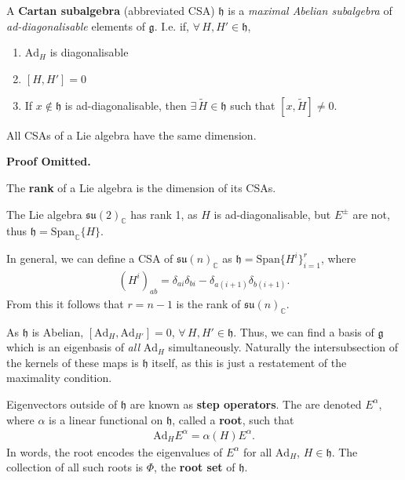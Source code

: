 \documentclass[11pt,fleqn]{article}
\renewenvironment{prop}{\begin{pBox}\begin{propT}}{\end{propT}\end{pBox}}
\begin{document}
\begin{definition}
	A \textbf{Cartan subalgebra} (abbreviated CSA) $\mathfrak{h}$ is a \textit{maximal Abelian subalgebra} of \\ \textit{ad-diagonalisable} elements of $\mathfrak{g}$. I.e. if, $\forall \, H, H' \in \mathfrak{h}$,
		\begin{enumerate}[label=(\roman*)]
			\item $\text{Ad}_H$ is diagonalisable
			\item $[H,H'] = 0$
			\item If $x \notin \mathfrak{h}$ is ad-diagonalisable, then $\exists \, \tilde{H}\in \mathfrak{h}$ such that $[x,\tilde{H}] \neq 0$.
		\end{enumerate}
\end{definition}

\begin{prop}
	All CSAs of a Lie algebra have the same dimension.
\end{prop}
\textbf{Proof Omitted.}

\begin{definition}
	The \textbf{rank} of a Lie algebra is the dimension of its CSAs.
\end{definition}

\begin{example}
	The Lie algebra $\mathfrak{su}(2)_\mathbb{C}$ has rank 1, as $H$ is ad-diagonalisable, but $E^\pm$ are not, thus $\mathfrak{h} = \text{Span}_\mathbb{C}\{H\}$.

	In general, we can define a CSA of $\mathfrak{su}(n)_\mathbb{C}$ as $\mathfrak{h} = \text{Span}\{H^i\}_{i=1}^r$, where
		\begin{align}
			(H^i)_{ab} = \delta_{ai}\delta_{bi} - \delta_{a(i+1)}\delta_{b(i+1)}.
		\end{align}
	From this it follows that $r = n-1$ is the rank of $\mathfrak{su}(n)_\mathbb{C}$.
\end{example}

\begin{remark}
	As $\mathfrak{h}$ is Abelian, $[\text{Ad}_H, \text{Ad}_{H'}] = 0$, $\forall \, H,H' \in \mathfrak{h}$. Thus, we can find a basis of $\mathfrak{g}$ which is an eigenbasis of \textit{all} $\text{Ad}_H$ simultaneously. Naturally the intersubsection of the kernels of these maps is $\mathfrak{h}$ itself, as this is just a restatement of the maximality condition.
\end{remark}

\begin{definition}
	Eigenvectors outside of $\mathfrak{h}$ are known as \textbf{step operators}. The are denoted $E^\alpha$, where $\alpha$ is a linear functional on $\mathfrak{h}$, called a \textbf{root}, such that
		\begin{align}
			\text{Ad}_H E^\alpha = \alpha(H) E^\alpha.
		\end{align}
	In words, the root encodes the eigenvalues of $E^\alpha$ for all $\text{Ad}_H$, $H\in\mathfrak{h}$. The collection of all such roots is $\Phi$, the \textbf{root set} of $\mathfrak{h}$.
\end{definition}
\end{document}
